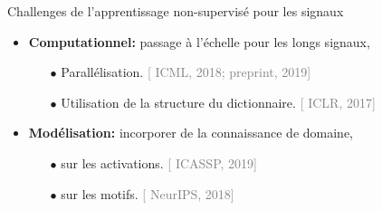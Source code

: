 \documentclass{beamer}
\def\keypoint#1{\hspace{0pt plus 1 filll}\textcolor{gray}{#1}}
\def\myitem{\hskip1em{\color{linkcolor} $\blacktriangleright$}\hskip.3em}
\begin{document}
\begin{frame}{Challenges de l'apprentissage non-supervisé pour les signaux}


%
%
%
%


\begin{itemize}\itemsep1.5em
    \item \textbf{Computationnel:} passage à l'échelle pour les longs signaux,
    \begin{itemize}\itemsep.5em
        \item[$\bullet$] Parallélisation.%
                         \keypoint{[{\color{linkcolor} ICML, 2018; preprint, 2019}]}
        \item[$\bullet$] Utilisation de la structure du dictionnaire.%
                         \keypoint{[{\color{linkcolor} ICLR, 2017}]}
    \end{itemize}

    \item \textbf{Modélisation:} incorporer de la connaissance de domaine,
    \begin{itemize}\itemsep.5em
        \item[$\bullet$] sur les activations.%
                         \keypoint{[{\color{linkcolor} ICASSP, 2019}]}
        \item[$\bullet$] sur les motifs.%
                         \keypoint{[{\color{linkcolor} NeurIPS, 2018}]}
    \end{itemize}


\end{itemize}
\end{frame}
\end{document}

